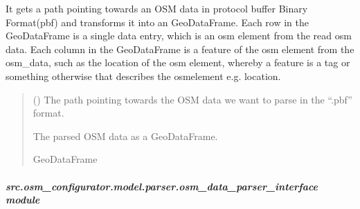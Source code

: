 \documentclass[letterpaper,10pt,english]{sphinxmanual}
\begin{document}
\begin{fulllineitems}
\begin{fulllineitems}
\label{\detokenize{apidoc/src.osm_configurator.model.parser:src.osm_configurator.model.parser.osm_data_parser.CategoryParser.parse_osm_data_file}}
\pysigstartsignatures
{}
\pysigstopsignatures
\sphinxAtStartPar
It gets a path pointing towards an OSM data in protocol buffer Binary Format(pbf) and transforms it into an
GeoDataFrame.
Each row in the GeoDataFrame is a single data entry, which is an osm element from the read osm data.
Each column in the GeoDataFrame is a feature of the osm element from the osm\_data, such as the location of the
osm element, whereby a feature is a tag or something otherwise that describes the osm\sphinxhyphen{}element e.g. location.
\begin{quote}\begin{description}
\sphinxAtStartPar
{} () \textendash{} The path pointing towards the OSM data we want to parse in the “.pbf” format.

\sphinxAtStartPar
The parsed OSM data as a GeoDataFrame.

\sphinxAtStartPar
GeoDataFrame

\end{description}\end{quote}

\end{fulllineitems}


\end{fulllineitems}



\subparagraph{src.osm\_configurator.model.parser.osm\_data\_parser\_interface module}
\label{\detokenize{apidoc/src.osm_configurator.model.parser:module-src.osm_configurator.model.parser.osm_data_parser_interface}}\label{\detokenize{apidoc/src.osm_configurator.model.parser:src-osm-configurator-model-parser-osm-data-parser-interface-module}}
\end{document}
